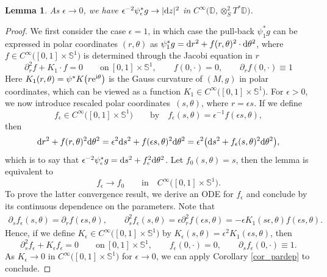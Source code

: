 \documentclass[10pt,a4paper]{amsart}
\numberwithin{equation}{section}
\newtheorem{Lemma}[Theorem]{Lemma}
\theoremstyle{definition}
\newcommand{\DD}{\mathbb{D}} %
\newcommand{\1}{{\bf 1}}
\begin{document}
\begin{Lemma}\label{lem_convtoeuclid}
As $\epsilon \rightarrow 0$, we have $\epsilon^{-2} \psi_\epsilon^*g \rightarrow |{\rm d}z|^2$ in $C^\infty\bigl(\DD,\otimes_S^2T^*\DD\bigr)$.
\end{Lemma}

\begin{proof}
We first consider the case $\epsilon =1$, in which case the pull-back $\psi_1^*g$ can be expressed in polar coordinates $(r,\theta)$ as
$\psi_1^*g = {\rm d}r^2 + f(r,\theta)^2 \cdot {\rm d}\theta^2$,
where $f\in C^\infty\bigl([0,1]\times \mathbb S^1\bigr)$ is determined through the Jacobi equation in $r$
\[
		\partial_r^2f + K_1\cdot f = 0 \qquad\text{on} \  [0,1]\times \mathbb S^1, \qquad f(0,\cdot) =0,\qquad \partial_{r}f(0,\cdot) \equiv 1
	\]
Here $K_1(r,\theta)=\psi^*K\bigl(r{\rm e}^{{\rm i}\theta}\bigr)$ is the Gauss curvature of $(M,g)$ in polar coordinates, which can be viewed as a function $K_1\in C^\infty\bigl([0,1]\times \mathbb S^1\bigr)
$. For $\epsilon>0$, we now introduce rescaled polar coordinates~$(s,\theta)$, where $r=\epsilon s$. If we define
\[
	f_\epsilon\in C^\infty\bigl([0,1]\times\mathbb S^1\bigr)\qquad \text{by}\quad f_\epsilon(s,\theta)=\epsilon^{-1}f(\epsilon s,\theta),
\]
then
\[
	{\rm d}r^2 + f(r,\theta)^2 {\rm d}\theta^2 = \epsilon^2 {\rm d}s^2 + f(\epsilon s,\theta)^2 {\rm d}\theta^2 = \epsilon^2\bigl({\rm d}s^2 + f_\epsilon(s,\theta)^2{\rm d}\theta^2\bigr),
\]
which is to say that $\epsilon^{-2} \psi_\epsilon^* g = {\rm d}s^2 + f_\epsilon^2 {\rm d}\theta^2$. Let $f_0(s,\theta)=s$, then the lemma is equivalent to
\[
	f_\epsilon \rightarrow f_0 \qquad \text{in}\quad C^\infty\bigl([0,1]\times \mathbb S^1\bigr).
\]
To prove the latter convergence result, we derive an ODE for $f_\epsilon$ and conclude by its continuous dependence on the parameters. Note that
\begin{gather*}
	\partial_s f_\epsilon(s,\theta)=\partial_r f(\epsilon s,\theta),\qquad
\partial_s^2f_\epsilon(s,\theta) =\epsilon \partial_r^2f(\epsilon s,\theta)= - \epsilon K_1(s\epsilon,\theta) f(\epsilon s,\theta).
\end{gather*}
Hence, if we define $K_\epsilon \in C^\infty\bigl([0,1]\times \mathbb S^1\bigr)$ by $K_\epsilon(s,\theta)=\epsilon^2 K_1(\epsilon s,\theta)$, then
\[
		\partial_s^2f_\epsilon + K_\epsilon f_\epsilon = 0 \qquad\text{on} \  [0,1]\times \mathbb S^1, \qquad f_\epsilon(0,\cdot) =0,\qquad \partial_{s}f_\epsilon(0,\cdot) \equiv 1.
	\]
As $K_\epsilon\rightarrow 0$ in $C^\infty\bigl([0,1]\times \mathbb S^1\bigr)$ for $\epsilon\rightarrow 0$, we can apply Corollary \ref{cor_pardep} to conclude.
\end{proof}
\end{document}
